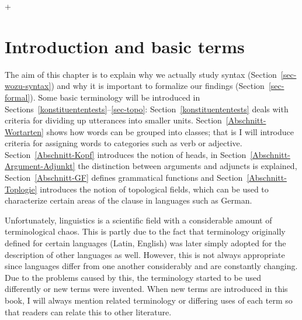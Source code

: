 +%

\chapter{Introduction and basic terms}
\label{Kapitel-Grundbegriffe}

The aim of this chapter is to explain why we actually study syntax
(Section~\ref{sec-wozu-syntax}) and why it is important to formalize our findings
(Section~\ref{sec-formal}). Some basic terminology will be introduced in
Sections~\ref{konstituententests}--\ref{sec-topo}: Section~\ref{konstituententests}
deals with criteria for dividing up utterances into smaller units. Section~\ref{Abschnitt-Wortarten} 
shows how words can be grouped into classes; that is I will introduce criteria for assigning words to
categories such as verb or adjective. Section~\ref{Abschnitt-Kopf} introduces the notion of 
heads, in
Section~\ref{Abschnitt-Argument-Adjunkt} the distinction between arguments and adjuncts is explained,
Section~\ref{Abschnitt-GF} defines grammatical functions and
Section~\ref{Abschnitt-Toplogie} introduces the notion of topological fields, which can be used to
characterize certain areas of the clause in languages such as German. 

Unfortunately, linguistics is a scientific field 
with a considerable amount of terminological chaos.
This is partly due to the fact that terminology originally defined for certain languages 
(\eg Latin, English)
was later simply adopted for the description of other languages as well. However, this is not always
appropriate since languages differ from one another considerably and are constantly changing.  
Due to the problems caused by this, the terminology started to be used differently or new terms were invented. 
When new terms are introduced in this book, I will always mention related terminology or differing uses of
each term so that readers can relate this to other literature.  


